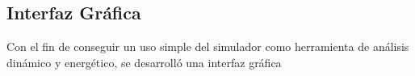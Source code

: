 \subsection{Interfaz Gráfica}
    Con el fin de conseguir un uso simple del simulador como herramienta de análisis dinámico y energético,
    se desarrolló una interfaz gráfica 